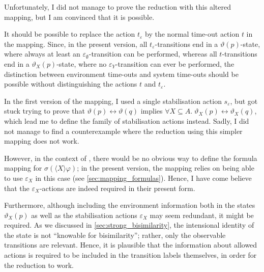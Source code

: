 \begin{isabellebody}
\begin{isamarkuptext}
Unfortunately, I did not manage to prove the reduction with this altered mapping, but I am convinced that it is possible.%
\end{isamarkuptext}\isamarkuptrue%
%
\isadelimdocument
%
\endisadelimdocument
%
\isatagdocument
%
\isamarkuptrue%
%
\isamarkuptrue%
%
\endisatagdocument
{\isafolddocument}%
%
\isadelimdocument
%
\endisadelimdocument
%
\begin{isamarkuptext}%
It should be possible to replace the action $t_\varepsilon$ by the normal time-out action $t$ in the mapping. Since, in the present version, all $t_\varepsilon$-transitions end in a $\vartheta(p)$-state, where always at least an $\varepsilon_\emptyset$-transition can be performed, whereas all $t$-transitions end in a $\vartheta_X(p)$-state, where no $\varepsilon_Y$-transition can ever be performed, the distinction between environment time-outs and system time-outs should be possible without distinguishing the actions $t$ and $t_\varepsilon$.%
\end{isamarkuptext}\isamarkuptrue%
%
\isadelimdocument
%
\endisadelimdocument
%
\isatagdocument
%
\isamarkuptrue%
%
\endisatagdocument
{\isafolddocument}%
%
\isadelimdocument
%
\endisadelimdocument
%
\begin{isamarkuptext}%
In the first version of the mapping, I used a single stabilisation action $s_\varepsilon$, but got stuck trying to prove that $\vartheta(p) \leftrightarrow \vartheta(q)$ implies $\forall X \subseteq A .\; \vartheta_X(p) \leftrightarrow \vartheta_X(q)$, which lead me to define the family of stabilisation actions instead. Sadly, I did not manage to find a counterexample where the reduction using this simpler mapping does not work. 

However, in the context of \HMLt{}, there would be no obvious way to define the formula mapping for $\sigma(\langle X \rangle \varphi)$; in the present version, the mapping relies on being able to use $\varepsilon_X$ in this case (see \cref{sec:mapping_formulas}). Hence, I have come believe that the $\varepsilon_X$-actions are indeed required in their present form.

Furthermore, although including the environment information both in the states $\vartheta_X(p)$ as well as the stabilisation actions $\varepsilon_X$ may seem redundant, it might be required. As we discussed in \cref{sec:strong_bisimilarity}, the intensional identity of the state is not \enquote{knowable for bisimilarity}; rather, only the observable transitions are relevant. Hence, it is plausible that the information about allowed actions is required to be included in the transition labels themselves, in order for the reduction to work.%
\end{isamarkuptext}\isamarkuptrue%
%
\isadelimtheory
%
\endisadelimtheory
%
\isatagtheory
%
\endisatagtheory
{\isafoldtheory}%
%
\isadelimtheory
%
\endisadelimtheory
%
\end{isabellebody}%
